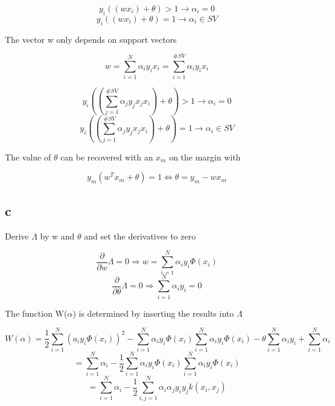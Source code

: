 \documentclass[11pt,abstract=on]{scrartcl}
\begin{document}
\begin{equation*}
y_i((w x_i) + \theta) > 1 \rightarrow \alpha_i = 0
\end{equation*}
\begin{equation*}
y_i((w x_i) + \theta) = 1 \rightarrow \alpha_i \in SV
\end{equation*}

The vector w only depends on support vectors

\begin{equation*}
w = \sum\limits_{i=1}^{N} \alpha_i y_i x_i = \sum\limits_{i=1}^{\#SV} \alpha_i y_i x_i
\end{equation*}

\begin{equation*}
y_i((\sum\limits_{j=1}^{\#SV} \alpha_j y_j x_j x_i) + \theta) > 1 \rightarrow \alpha_i = 0
\end{equation*}
\begin{equation*}
y_i((\sum\limits_{j=1}^{\#SV} \alpha_j y_j x_j x_i) + \theta) = 1 \rightarrow \alpha_i \in SV
\end{equation*}

The value of $\theta$ can be recovered with an $x_m$ on the margin with

\begin{equation*}
y_m (w^T x_m + \theta) = 1 \Leftrightarrow \theta = y_m - w x_m
\end{equation*}

\subsection{c}


Derive $\Lambda$ by w and $\theta$ and set the derivatives to zero

\begin{equation*}
\frac{\partial}{\partial w} \Lambda = 0 \Rightarrow w = \sum\limits_{i=1}^{N}\alpha_i y_i \Phi(x_i)
\end{equation*}
\begin{equation*}
 \frac{\partial}{\partial \theta} \Lambda = 0 \Rightarrow \sum\limits_{i=1}^{N}\alpha_i y_i = 0
\end{equation*}

The function W($\alpha$) is determined by inserting the results into $\Lambda$

\begin{equation*}
W(\alpha) = \frac{1}{2}\sum\limits_{i=1}^{N}(a_i y_i \Phi(x_i))^2 - \sum\limits_{i=1}^{N} \alpha_i y_i \Phi(x_i) \sum\limits_{i=1}^{N} \alpha_i y_i \Phi(x_i) - \theta \sum\limits_{i=1}^{N} \alpha_i y_i + \sum\limits_{i=1}^{N} \alpha_i
\end{equation*}
\begin{equation*}
= \sum\limits_{i=1}^{N} \alpha_i-\frac{1}{2} \sum\limits_{i=1}^{N} \alpha_i y_i \Phi(x_i) \sum\limits_{i=1}^{N} \alpha_i y_i \Phi(x_i)
\end{equation*}
\begin{equation*}
= \sum\limits_{i=1}^{N} \alpha_i-\frac{1}{2} \sum\limits_{i,j=1}^{N} \alpha_i \alpha_j y_i y_j k(x_i, x_j)
\end{equation*}
\end{document}
